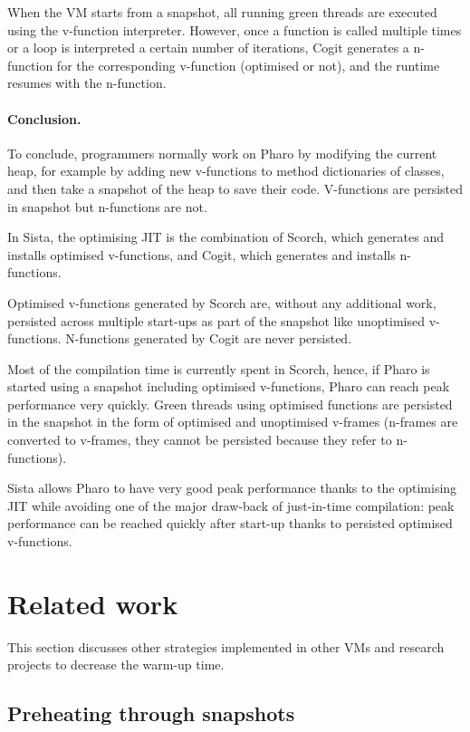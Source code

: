 \documentclass[a4paper,12pt,twoside]{../includes/ThesisStyle}
\begin{document}
When the VM starts from a snapshot, all running green threads are executed using the v-function interpreter. However, once a function is called multiple times or a loop is interpreted a certain number of iterations, Cogit generates a n-function for the corresponding v-function (optimised or not), and the runtime resumes with the n-function.

\paragraph{Conclusion.}To conclude, programmers normally work on Pharo by modifying the current heap, for example by adding new v-functions to method dictionaries of classes, and then take a snapshot of the heap to save their code. V-functions are persisted in snapshot but n-functions are not. 

In Sista, the optimising JIT is the combination of Scorch, which generates and installs optimised v-functions, and Cogit, which generates and installs n-functions. 

Optimised v-functions generated by Scorch are, without any additional work, persisted across multiple start-ups as part of the snapshot like unoptimised v-functions. N-functions generated by Cogit are never persisted. 

Most of the compilation time is currently spent in Scorch, hence, if Pharo is started using a snapshot including optimised v-functions, Pharo can reach peak performance very quickly. Green threads using optimised functions are persisted in the snapshot in the form of optimised and unoptimised v-frames (n-frames are converted to v-frames, they cannot be persisted because they refer to n-functions). 

Sista allows Pharo to have very good peak performance thanks to the optimising JIT while avoiding one of the major draw-back of just-in-time compilation: peak performance can be reached quickly after start-up thanks to persisted optimised v-functions.


\section{Related work}
\label{sec:relWork}

This section discusses other strategies implemented in other VMs and research projects to decrease the warm-up time.

\subsection{Preheating through snapshots}
\end{document}
